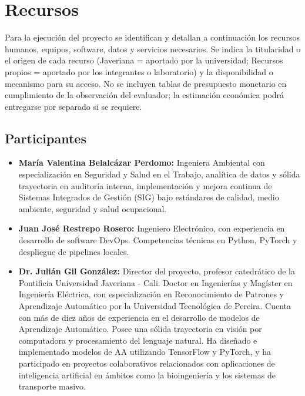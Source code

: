 \section{Recursos}

Para la ejecución del proyecto se identifican y detallan a continuación los recursos humanos, equipos, software, datos y servicios necesarios. Se indica la titularidad o el origen de cada recurso (Javeriana = aportado por la universidad; Recursos propios = aportado por los integrantes o laboratorio) y la disponibilidad o mecanismo para su acceso. No se incluyen tablas de presupuesto monetario en cumplimiento de la observación del evaluador; la estimación económica podrá entregarse por separado si se requiere.

\subsection{Participantes}
\begin{itemize}
    \item \textbf{María Valentina Belalcázar Perdomo:} Ingeniera Ambiental con especialización en Seguridad y Salud en el Trabajo, analítica de datos y sólida trayectoria en auditoría interna, implementación y mejora continua de Sistemas Integrados de Gestión (SIG) bajo estándares de calidad, medio ambiente, seguridad y salud ocupacional.
    
    \item \textbf{Juan José Restrepo Rosero:} Ingeniero Electrónico, con experiencia en desarrollo de software DevOps. Competencias técnicas en Python, PyTorch y despliegue de pipelines locales.
    
    \item \textbf{Dr. Julián Gil González:} Director del proyecto, profesor catedrático de la Pontificia Universidad Javeriana - Cali. Doctor en Ingenierías y Magíster en Ingeniería Eléctrica, con especialización en Reconocimiento de Patrones y Aprendizaje Automático por la Universidad Tecnológica de Pereira. Cuenta con más de diez años de experiencia en el desarrollo de modelos de Aprendizaje Automático. Posee una sólida trayectoria en visión por computadora y procesamiento del lenguaje natural. Ha diseñado e implementado modelos de AA utilizando TensorFlow y PyTorch, y ha participado en proyectos colaborativos relacionados con aplicaciones de inteligencia artificial en ámbitos como la bioingeniería y los sistemas de transporte masivo.
\end{itemize}

